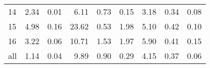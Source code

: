\begin{tabular}{lrrrrrrrr}
         14 &      2.34 &     0.01 &                      6.11 &   0.73 & 0.15 &    3.18 &                 0.34 &                    0.08 \\
         15 &      4.98 &     0.16 &                     23.62 &   0.53 & 1.98 &    5.10 &                 0.42 &                    0.10 \\
         16 &      3.22 &     0.06 &                     10.71 &   1.53 & 1.97 &    5.90 &                 0.41 &                    0.15 \\
        all &      1.14 &     0.04 &                      9.89 &   0.90 & 0.29 &    4.15 &                 0.37 &                    0.06 \\
\bottomrule
\end{tabular}
